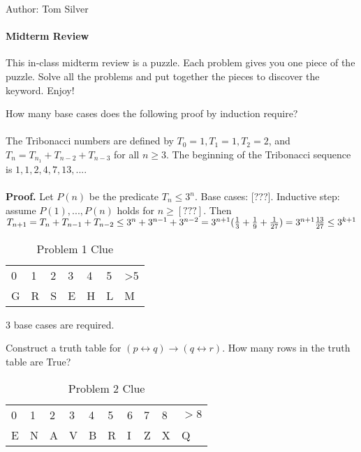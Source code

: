\documentclass[solution, letterpaper]{cs20inclass}
\begin{document}

\noindent Author: Tom Silver%

\paragraph*{Midterm Review}
This in-class midterm review is a puzzle. Each problem gives you one piece of the puzzle. Solve all the problems and put together the pieces to discover the keyword. Enjoy!

\problem How many base cases does the following proof by induction require?
\\
\\ The Tribonacci numbers are defined by $T_0 = 1, T_1 = 1, T_2 = 2$, and $T_n = T_{n_1} + T_{n-2} + T_{n-3}$ for all $n \ge 3$. The beginning of the Tribonacci sequence is $1, 1, 2, 4, 7, 13, ...$. 
\\
\\ \textbf{Proof.} Let $P(n)$ be the predicate $T_n \le 3^n$. Base cases: [???]. Inductive step: assume $P(1), ..., P(n)$ holds for $n \ge [???]$. Then 
\begin{math}
T_{n+1} = T_n + T_{n-1} + T_{n-2}
\\ \le 3^n + 3^{n-1} + 3^{n-2}
\\ = 3^{n+1}(\frac{1}{3} + \frac{1}{9} + \frac{1}{27})
\\ = 3^{n+1}\frac{13}{27}
\\ \le 3^{k+1}
\end{math} 


\begin{table}[h]
\centering
\begin{tabular}{lllllll}
0 & 1 & 2 & 3 & 4 & 5 & >5 \\
G & R & S & E & H & L & M
\end{tabular}
\caption*{Problem 1 Clue}
\end{table}

\begin{solution}
3 base cases are required.
\end{solution}

\problem Construct a truth table for $(p \leftrightarrow q) \to (q \leftrightarrow r)$. How many rows in the truth table are True?

\begin{table}[h]
\centering
\begin{tabular}{llllllllll}
0 & 1 & 2 & 3 & 4 & 5 & 6 & 7 & 8 & $>8$ \\
E & N & A & V & B & R & I & Z & X & Q            
\end{tabular}
\caption*{Problem 2 Clue}
\end{table}
\end{document}
